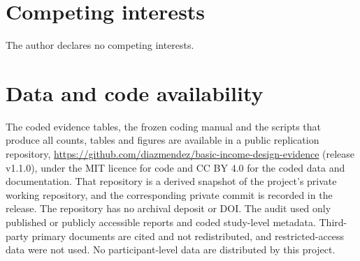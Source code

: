 \documentclass[11pt]{article}
\begin{document}
\section*{Competing interests}
The author declares no competing interests.


\section*{Data and code availability}
The coded evidence tables, the frozen coding manual and the scripts that produce all counts, tables and figures are available in a public replication repository, \url{https://github.com/diazmendez/basic-income-design-evidence} (release v1.1.0), under the MIT licence for code and CC BY 4.0 for the coded data and documentation. That repository is a derived snapshot of the project's private working repository, and the corresponding private commit is recorded in the release. The repository has no archival deposit or DOI. The audit used only published or publicly accessible reports and coded study-level metadata. Third-party primary documents are cited and not redistributed, and restricted-access data were not used. No participant-level data are distributed by this project.



\end{document}
